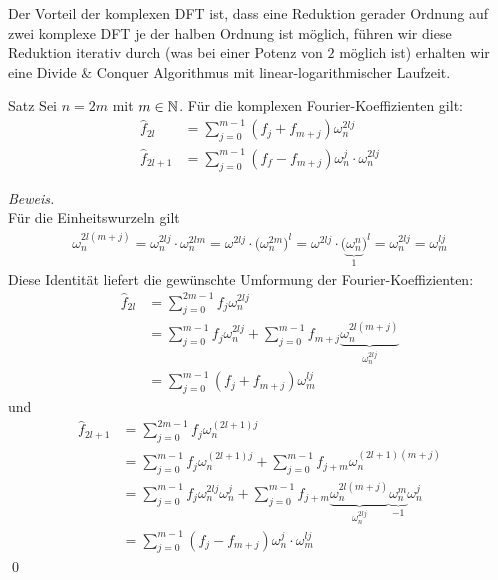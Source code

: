 Der Vorteil der komplexen DFT ist, dass eine Reduktion gerader Ordnung auf zwei komplexe DFT je der halben
Ordnung ist möglich, führen wir diese Reduktion iterativ durch (was bei einer Potenz von $2$ möglich ist) 
erhalten wir eine Divide \& Conquer Algorithmus mit linear-logarithmischer Laufzeit.

\begin{colbox}{Satz}
  Sei $n=2m$ mit $m\in\mathbb N$. Für die komplexen Fourier-Koeffizienten gilt:
  \begin{align*}
    \hat{f}_{2l} &= \sum_{j=0}^{m-1} (f_j+f_{m+j})\omega_n^{2lj} \\
    \hat{f}_{2l+1} &= \sum_{j=0}^{m-1} (f_f-f_{m+j})\omega_n^{j}\cdot\omega_n^{2lj}
  \end{align*}
\end{colbox}

\textit{Beweis.} \\
Für die Einheitswurzeln gilt 
%
\begin{align*}
  \omega_n^{2l(m+j)} 
  = \omega_n^{2lj}\cdot \omega_n^{2lm} 
  = \omega^{2lj}\cdot \big(\omega_n^{2m}\big)^l
  = \omega^{2lj}\cdot \big(\underbrace{\omega_n^n}_{1}\big)^l
  = \omega_n^{2lj} = \omega_m^{lj}
\end{align*}
%
Diese Identität liefert die gewünschte Umformung der Fourier-Koeffizienten:
%
\begin{align*}
  \hat{f}_{2l} 
  &= \sum_{j=0}^{2m-1}f_j\omega_n^{2lj} \\
  &= \sum_{j=0}^{m-1} f_j\omega_n^{2lj} + \sum_{j=0}^{m-1} f_{m+j}\underbrace{\omega_n^{2l(m+j)}}_{\omega_n^{2lj}} \\
  &= \sum_{j=0}^{m-1} (f_j+f_{m+j})\omega_m^{lj}
\end{align*}
und 
\begin{align*}
  \hat{f}_{2l+1} &= \sum_{j=0}^{2m-1} f_j\omega_n^{(2l+1)j} \\
  &= \sum_{j=0}^{m-1}f_j\omega_n^{(2l+1)j} + \sum_{j=0}^{m-1} f_{j+m}\omega_n^{(2l+1)(m+j)}\\
  &= \sum_{j=0}^{m-1}f_j\omega_n^{2lj}\omega_n^j + \sum_{j=0}^{m-1} f_{j+m}
  \underbrace{\omega_n^{2l(m+j)}}_{\omega_n^{2lj}}
  \underbrace{\omega_n^{m}}_{-1}\omega_n^{j}\\
  &= \sum_{j=0}^{m-1}(f_j-f_{m+j})\omega_n^{j}\cdot\omega_m^{lj}
\end{align*}
%
\qed

